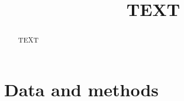 \documentclass[amt, manuscript]{copernicus}
\begin{document}
\title{TEXT}



\Author[]{}{}
\Author[]{}{}
\Author[]{}{}












\maketitle



\begin{abstract}
TEXT
\end{abstract}




\introduction  %

\section{Data and methods}
\end{document}
